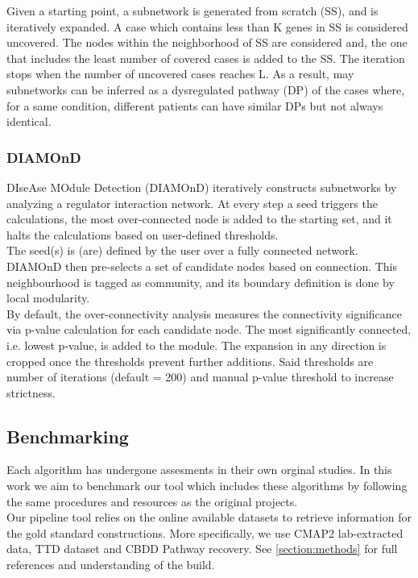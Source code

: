 Given a starting point, a subnetwork is generated from scratch (SS), and is iteratively expanded. A case which contains less than K genes in SS is considered uncovered. The nodes within the neighborhood of SS are considered and, the one that includes the least number of covered cases is added to the SS. The iteration stops when the number of uncovered cases reaches L. As a result, may subnetworks can be inferred as a dysregulated pathway (DP) of the cases where, for a same condition, different patients can have similar DPs but not always identical.

\subsubsection{DIAMOnD}
DIseAse MOdule Detection (DIAMOnD) \cite{Ghiassian2015AInteractome} iteratively constructs subnetworks by analyzing a regulator interaction network. At every step a seed triggers the calculations, the most over-connected node is added to the starting set, and it halts the calculations based on user-defined thresholds.
\\

The seed(s) is (are) defined by the user over a fully connected network. DIAMOnD then pre-selects a set of candidate nodes based on connection. This neighbourhood is tagged as community, and its boundary definition is done by local modularity.
\\

By default, the over-connectivity analysis measures the connectivity significance via p-value calculation for each candidate node. The most significantly connected, i.e. lowest p-value, is added to the module. The expansion in any direction is cropped once the thresholds prevent further additions. Said thresholds are number of iterations (default = 200) and manual p-value threshold to increase strictness.

\subsection{Benchmarking}
Each algorithm has undergone assesments in their own orginal studies. In this work we aim to benchmark our tool which includes these algorithms by following the same procedures and resources as the original projects. 
\\

Our pipeline tool relies on the online available datasets to retrieve information for the gold standard constructions. More specifically, we use CMAP2 lab-extracted data, TTD dataset and CBDD Pathway recovery. See \ref{section:methods} for full references and understanding of the build.
\\

